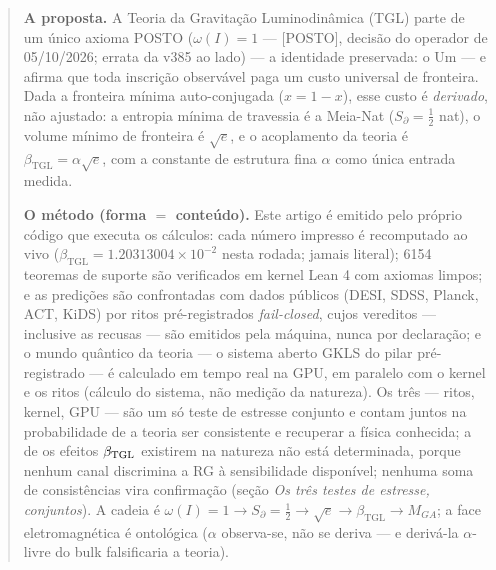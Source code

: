 \documentclass[11pt]{article}
\newcommand{\bTGL}{\beta_{\mathrm{TGL}}}\newcommand{\Msun}{M_{\odot}}\newcommand{\TGL}{\mathrm{TGL}}
\theoremstyle{definition}\newtheorem{deriv}{Derivação}
\begin{document}
\begin{abstract}

\textbf{A proposta.} A Teoria da Gravitação Luminodinâmica (TGL) parte de um único axioma \textsf{POSTO} ($\omega(I)=1$ --- \textsf{[POSTO]}, decisão do operador de 05/10/2026; errata da v385 ao lado) --- a identidade preservada: o Um --- e afirma que toda inscrição observável paga um custo universal de fronteira. Dada a fronteira mínima auto-conjugada ($x=1-x$), esse custo é \emph{derivado}, não ajustado: a entropia mínima de travessia é a Meia-Nat ($S_\partial=\tfrac12$ nat), o volume mínimo de fronteira é $\sqrt e$, e o acoplamento da teoria é $\bTGL=\alpha\sqrt e$, com a constante de estrutura fina $\alpha$ como única entrada medida.

\textbf{O método (forma $=$ conteúdo).} Este artigo é emitido pelo próprio código que executa os cálculos: cada número impresso é recomputado ao vivo ($\bTGL=1.20313004\times10^{-2}$ nesta rodada; jamais literal); 6154 teoremas de suporte são verificados em kernel Lean 4 com axiomas limpos; e as predições são confrontadas com dados públicos (DESI, SDSS, Planck, ACT, KiDS) por ritos pré-registrados \emph{fail-closed}, cujos vereditos --- inclusive as recusas --- são emitidos pela máquina, nunca por declaração; e o mundo quântico da teoria --- o sistema aberto GKLS do pilar pré-registrado --- é calculado em tempo real na GPU, em paralelo com o kernel e os ritos (cálculo do sistema, não medição da natureza). Os três --- ritos, kernel, GPU --- são um só teste de estresse conjunto e contam juntos na probabilidade de a teoria ser consistente e recuperar a física conhecida; a de os efeitos $\beta_{\rm TGL}$ existirem na natureza não está determinada, porque nenhum canal discrimina a RG à sensibilidade disponível; nenhuma soma de consistências vira confirmação (seção \emph{Os três testes de estresse, conjuntos}). A cadeia é $\omega(I)=1\to S_\partial=\tfrac12\to\sqrt e\to\bTGL\to M_{GA}$; a face eletromagnética é ontológica ($\alpha$ observa-se, não se deriva --- e derivá-la $\alpha$-livre do bulk falsificaria a teoria).


\end{abstract}
\end{document}
